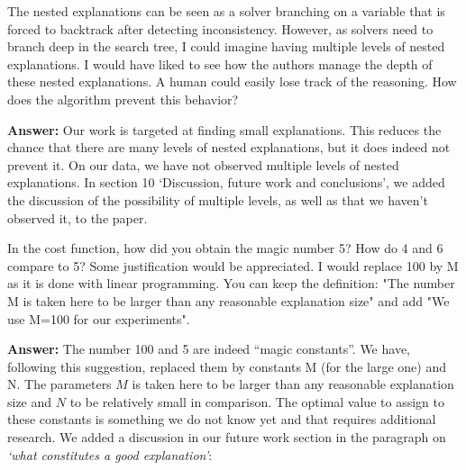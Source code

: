 \documentclass{article}
\newcommand\comment[1]{\marginpar{\tiny #1}}
\renewcommand\comment[1]{#1}
\newcommand{\tias}[1]{{\comment{\color{blue}\textsc{TG:}#1}}}
\newcommand{\answer}[1]{{\comment{\textbf{Answer:} #1}}}
\newcommand{\bart}[1]{{\comment{\color{green} \textsc{BB:}#1}}}
\begin{document}
\begin{quoteit}
The nested explanations can be seen as a solver branching on a variable that is forced to backtrack after detecting inconsistency. However, as solvers need to branch deep in the search tree, I could imagine having multiple levels of nested explanations. I would have liked to see how the authors manage the depth of these nested explanations. A human could easily lose track of the reasoning. How does the algorithm prevent this behavior?
\end{quoteit}

\answer{Our work is targeted at finding small explanations. This reduces the chance that there are many levels of nested explanations, but it does indeed not prevent it. On our data, we have not observed multiple levels of nested explanations. In section 10 `Discussion, future work and conclusions', we added the discussion of the possibility of multiple levels, as well as that we haven't observed it, to the paper.} 

\begin{quoteit}
In the cost function, how did you obtain the magic number 5? How do 4 and 6 compare to 5? Some justification would be appreciated. 
I would replace 100 by M as it is done with linear programming. You can keep the definition: "The number M is taken here to be larger than any reasonable explanation size" and add "We use M=100 for our experiments".
\end{quoteit}

\answer{
	The number 100 and 5 are indeed ``magic constants''. We have, following this suggestion, replaced them by constants M (for the large one) and N. The parameters $M$ is taken here to be larger than any reasonable explanation size and $N$ to be relatively small in comparison. The optimal value to assign to these constants is something we do not know yet and that requires additional research. We added a discussion in our future work section in the paragraph on \emph{`what constitutes a good explanation'}:}
\end{document}
